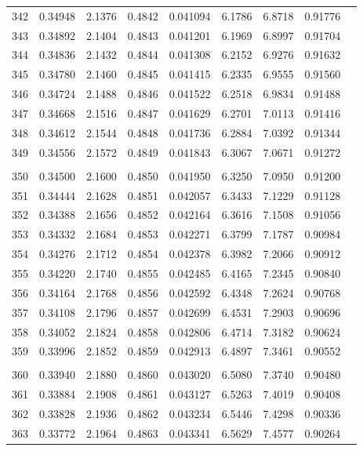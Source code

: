 \documentclass[letter,twosides,10pt]{article}
\begin{document}
\begin{longtable}{|c|c|c|c|c|c|c|c|c|}
342 & 0.34948 & 2.1376 & 0.4842 & 0.041094 & 6.1786 &  6.8718 & 0.91776 \\
343 & 0.34892 & 2.1404 & 0.4843 & 0.041201 & 6.1969 &  6.8997 & 0.91704 \\
344 & 0.34836 & 2.1432 & 0.4844 & 0.041308 & 6.2152 &  6.9276 & 0.91632 \\
345 & 0.34780 & 2.1460 & 0.4845 & 0.041415 & 6.2335 &  6.9555 & 0.91560 \\
346 & 0.34724 & 2.1488 & 0.4846 & 0.041522 & 6.2518 &  6.9834 & 0.91488 \\
347 & 0.34668 & 2.1516 & 0.4847 & 0.041629 & 6.2701 &  7.0113 & 0.91416 \\
348 & 0.34612 & 2.1544 & 0.4848 & 0.041736 & 6.2884 &  7.0392 & 0.91344 \\
349 & 0.34556 & 2.1572 & 0.4849 & 0.041843 & 6.3067 &  7.0671 & 0.91272 \\
 & & & & & & & \\
350 & 0.34500 & 2.1600 & 0.4850 & 0.041950 & 6.3250 &  7.0950 & 0.91200 \\
351 & 0.34444 & 2.1628 & 0.4851 & 0.042057 & 6.3433 &  7.1229 & 0.91128 \\
352 & 0.34388 & 2.1656 & 0.4852 & 0.042164 & 6.3616 &  7.1508 & 0.91056 \\
353 & 0.34332 & 2.1684 & 0.4853 & 0.042271 & 6.3799 &  7.1787 & 0.90984 \\
354 & 0.34276 & 2.1712 & 0.4854 & 0.042378 & 6.3982 &  7.2066 & 0.90912 \\
355 & 0.34220 & 2.1740 & 0.4855 & 0.042485 & 6.4165 &  7.2345 & 0.90840 \\
356 & 0.34164 & 2.1768 & 0.4856 & 0.042592 & 6.4348 &  7.2624 & 0.90768 \\
357 & 0.34108 & 2.1796 & 0.4857 & 0.042699 & 6.4531 &  7.2903 & 0.90696 \\
358 & 0.34052 & 2.1824 & 0.4858 & 0.042806 & 6.4714 &  7.3182 & 0.90624 \\
359 & 0.33996 & 2.1852 & 0.4859 & 0.042913 & 6.4897 &  7.3461 & 0.90552 \\
 & & & & & & & \\
360 & 0.33940 & 2.1880 & 0.4860 & 0.043020 & 6.5080 &  7.3740 & 0.90480 \\
361 & 0.33884 & 2.1908 & 0.4861 & 0.043127 & 6.5263 &  7.4019 & 0.90408 \\
362 & 0.33828 & 2.1936 & 0.4862 & 0.043234 & 6.5446 &  7.4298 & 0.90336 \\
363 & 0.33772 & 2.1964 & 0.4863 & 0.043341 & 6.5629 &  7.4577 & 0.90264 \\

\end{longtable}
\end{document}
